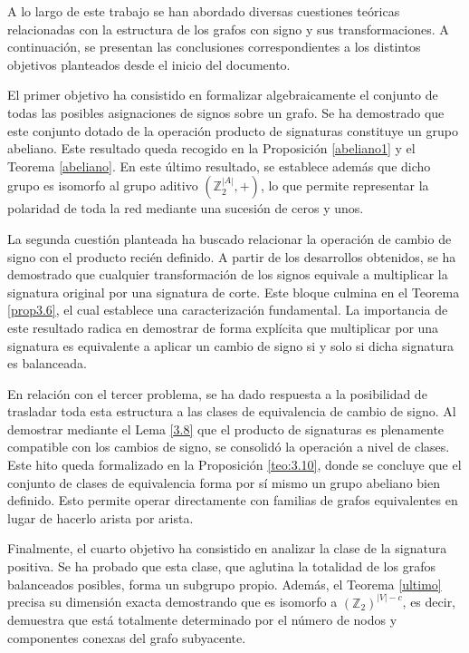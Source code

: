 \documentclass[11pt,a4paper,spanish]{report}
\theoremstyle{plain}
\begin{document}
A lo largo de este trabajo se han abordado diversas cuestiones teóricas relacionadas con la estructura de los grafos con signo y sus transformaciones. A continuación, se presentan las conclusiones correspondientes a los distintos objetivos planteados desde el inicio del documento.

El primer objetivo ha consistido en formalizar algebraicamente el conjunto de todas las posibles asignaciones de signos sobre un grafo. Se ha demostrado que este conjunto dotado de la operación producto de signaturas constituye un grupo abeliano. Este resultado queda recogido en la Proposición \ref{abeliano1} y el Teorema \ref{abeliano}. En este último resultado, se establece  además que dicho grupo es isomorfo al grupo aditivo $(\mathbb{Z}_2^{|A|}, +)$, lo que permite representar la polaridad de toda la red mediante una sucesión de ceros y unos.

La segunda cuestión planteada ha buscado relacionar la operación de cambio de signo con el producto recién definido. A partir de los desarrollos obtenidos, se ha demostrado que cualquier transformación de los signos equivale a multiplicar la signatura original por una signatura de corte. Este bloque culmina en el Teorema \ref{prop3.6}, el cual establece una caracterización fundamental. La importancia de este resultado radica en demostrar de forma explícita que multiplicar por una signatura es equivalente a aplicar un cambio de signo si y solo si dicha signatura es balanceada.

En relación con el tercer problema, se ha dado respuesta a la posibilidad de trasladar toda esta estructura a las clases de equivalencia de cambio de signo. Al demostrar mediante el Lema \ref{3.8} que el producto de signaturas es plenamente compatible con los cambios de signo, se consolidó la operación a nivel de clases. Este hito queda formalizado en la Proposición \ref{teo:3.10}, donde se concluye que el conjunto de clases de equivalencia forma por sí mismo un grupo abeliano bien definido. Esto permite operar directamente con familias de grafos equivalentes en lugar de hacerlo arista por arista.

Finalmente, el cuarto objetivo ha consistido en analizar la clase de la signatura positiva. Se ha probado que esta clase, que aglutina la totalidad de los grafos balanceados posibles, forma un subgrupo propio. Además, el Teorema \ref{ultimo} precisa su dimensión exacta demostrando que es isomorfo a $(\mathbb{Z}_2)^{|V|-c}$, es decir, demuestra que está totalmente determinado por el número de nodos y componentes conexas del grafo subyacente.
\end{document}
